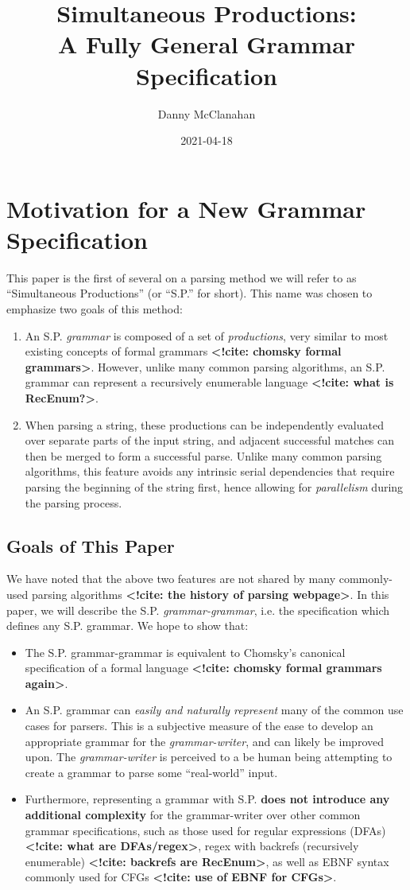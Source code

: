 \documentclass[10pt]{article}
\title{Simultaneous Productions: \\ A Fully General Grammar Specification}
\date{2021-04-18}
\author{Danny McClanahan}
\newcommand{\todocite}[1]{\textbf{<!cite: #1>}}
\begin{document}
\maketitle

\section{Motivation for a New Grammar Specification}
\label{sec:motivation}

\noindent This paper is the first of several on a parsing method we will refer to as ``Simultaneous Productions'' (or ``S.P.'' for short). This name was chosen to emphasize two goals of this method:
\begin{enumerate}
  \item An S.P. \textit{grammar} is composed of a set of \textit{productions}, very similar to most existing concepts of formal grammars \todocite{chomsky formal grammars}. However, unlike many common parsing algorithms, an S.P. grammar can represent a recursively enumerable language \todocite{what is RecEnum?}.
  \item When parsing a string, these productions can be independently evaluated over separate parts of the input string, and adjacent successful matches can then be merged to form a successful parse. Unlike many common parsing algorithms, this feature avoids any intrinsic serial dependencies that require parsing the beginning of the string first, hence allowing for \textit{parallelism} during the parsing process.
\end{enumerate}

\subsection{Goals of This Paper}
\label{sec:goals}
\noindent We have noted that the above two features are not shared by many commonly-used parsing algorithms \todocite{the history of parsing webpage}. In this paper, we will describe the S.P. \textit{grammar-grammar}, i.e. the specification which defines any S.P. grammar. We hope to show that:
\begin{itemize}
  \item The S.P. grammar-grammar is equivalent to Chomsky's canonical specification of a formal language \todocite{chomsky formal grammars again}.
  \item An S.P. grammar can \textit{easily and naturally represent} many of the common use cases for parsers. This is a subjective measure of the ease to develop an appropriate grammar for the \textit{grammar-writer}, and can likely be improved upon. The \textit{grammar-writer} is perceived to a be human being attempting to create a grammar to parse some ``real-world'' input.
  \item Furthermore, representing a grammar with S.P. \textbf{does not introduce any additional complexity} for the grammar-writer over other common grammar specifications, such as those used for regular expressions (DFAs) \todocite{what are DFAs/regex}, regex with backrefs (recursively enumerable) \todocite{backrefs are RecEnum}, as well as EBNF syntax commonly used for CFGs \todocite{use of EBNF for CFGs}.
\end{itemize}
\end{document}
